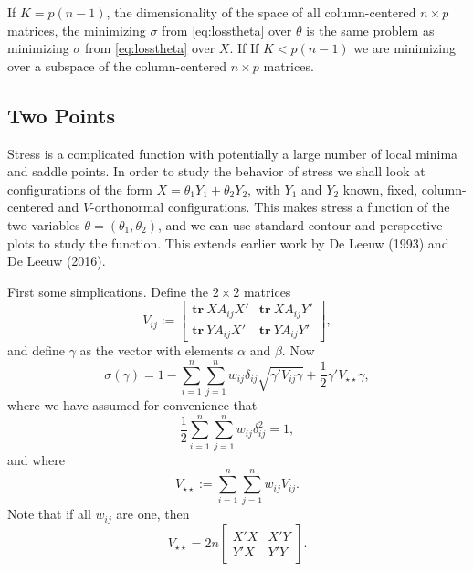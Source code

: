 \documentclass[
  12pt,
]{article}
\begin{document}
If \(K=p(n-1)\), the dimensionality of the space of all column-centered \(n\times p\)
matrices, the minimizing \(\sigma\) from \eqref{eq:losstheta} over \(\theta\) is
the same problem as minimizing \(\sigma\) from \eqref{eq:losstheta} over \(X\). If
If \(K<p(n-1)\) we are minimizing over a subspace of the column-centered \(n\times p\)
matrices.

\subsection{Two Points}\label{two-points}

Stress is a complicated function with potentially a large number of local minima and saddle points. In order to study the behavior of stress we shall
look at configurations of the form \(X=\theta_1 Y_1+\theta_2 Y_2\), with \(Y_1\) and \(Y_2\) known, fixed, column-centered and \(V\)-orthonormal configurations. This makes stress a function of the two variables \(\theta=(\theta_1,\theta_2)\), and we can use standard contour and perspective plots to study the function. This extends earlier work by De Leeuw (1993) and De Leeuw (2016).

First some simplications. Define the \(2\times 2\) matrices
\[
V_{ij}:=\begin{bmatrix}\mathbf{tr}\ XA_{ij}X'&\mathbf{tr}\ XA_{ij}Y'\\\mathbf{tr}\ YA_{ij}X'&\mathbf{tr}\ YA_{ij}Y'\end{bmatrix},
\]
and define \(\gamma\) as the vector with elements \(\alpha\) and \(\beta\). Now
\begin{equation}
\sigma(\gamma)=1-\sum_{i=1}^n\sum_{j=1}^nw_{ij}\delta_{ij}\sqrt{\gamma'V_{ij}\gamma}+\frac12\gamma'V_{\star\star}\gamma,\label{E:gamma}
\end{equation}
where we have assumed for convenience that
\[
\frac12\sum_{i=1}^n\sum_{j=1}^nw_{ij}\delta_{ij}^2=1,
\]
and where
\[
V_{\star\star}:=\sum_{i=1}^n\sum_{j=1}^n w_{ij}V_{ij}.
\]
Note that if all \(w_{ij}\) are one, then
\[
V_{\star\star}=2n\begin{bmatrix}X'X&X'Y\\Y'X&Y'Y\end{bmatrix}.
\]
\end{document}
